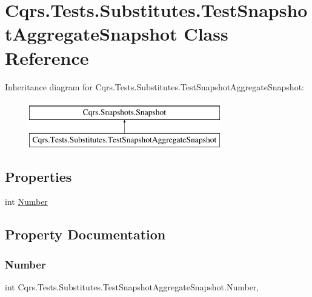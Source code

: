 \hypertarget{classCqrs_1_1Tests_1_1Substitutes_1_1TestSnapshotAggregateSnapshot}{}\section{Cqrs.\+Tests.\+Substitutes.\+Test\+Snapshot\+Aggregate\+Snapshot Class Reference}
\label{classCqrs_1_1Tests_1_1Substitutes_1_1TestSnapshotAggregateSnapshot}
Inheritance diagram for Cqrs.\+Tests.\+Substitutes.\+Test\+Snapshot\+Aggregate\+Snapshot\+:\begin{figure}[H]
\begin{center}
\leavevmode
\includegraphics[height=2.000000cm]{classCqrs_1_1Tests_1_1Substitutes_1_1TestSnapshotAggregateSnapshot}
\end{center}
\end{figure}
\subsection*{Properties}
\begin{DoxyCompactItemize}
\item 
int \hyperlink{classCqrs_1_1Tests_1_1Substitutes_1_1TestSnapshotAggregateSnapshot_a0f27b6f734529ba45b4b04694ac2f65d_a0f27b6f734529ba45b4b04694ac2f65d}{Number}
\end{DoxyCompactItemize}


\subsection{Property Documentation}
\mbox{\label{classCqrs_1_1Tests_1_1Substitutes_1_1TestSnapshotAggregateSnapshot_a0f27b6f734529ba45b4b04694ac2f65d_a0f27b6f734529ba45b4b04694ac2f65d}} 
\subsubsection{\texorpdfstring{Number}{Number}}
{\footnotesize\ttfamily int Cqrs.\+Tests.\+Substitutes.\+Test\+Snapshot\+Aggregate\+Snapshot.\+Number\hspace{0.3cm}{\ttfamily [get]}, {\ttfamily [set]}}

